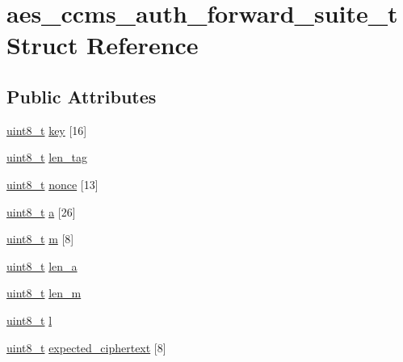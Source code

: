 \hypertarget{structaes__ccms__auth__forward__suite__t}{}\section{aes\+\_\+ccms\+\_\+auth\+\_\+forward\+\_\+suite\+\_\+t Struct Reference}
\label{structaes__ccms__auth__forward__suite__t}
\subsection*{Public Attributes}
\begin{DoxyCompactItemize}
\item 
\hyperlink{_p_e___types_8h_aba7bc1797add20fe3efdf37ced1182c5}{uint8\+\_\+t} \hyperlink{structaes__ccms__auth__forward__suite__t_a47a01dba8f3ab523da7969298e3bc4a3}{key} \mbox{[}16\mbox{]}
\item 
\hyperlink{_p_e___types_8h_aba7bc1797add20fe3efdf37ced1182c5}{uint8\+\_\+t} \hyperlink{structaes__ccms__auth__forward__suite__t_aa2c4b87795a4d73e649721442713d1e8}{len\+\_\+tag}
\item 
\hyperlink{_p_e___types_8h_aba7bc1797add20fe3efdf37ced1182c5}{uint8\+\_\+t} \hyperlink{structaes__ccms__auth__forward__suite__t_aad0f471a708074e5f342a2c31bdd879f}{nonce} \mbox{[}13\mbox{]}
\item 
\hyperlink{_p_e___types_8h_aba7bc1797add20fe3efdf37ced1182c5}{uint8\+\_\+t} \hyperlink{structaes__ccms__auth__forward__suite__t_afaf316fe3f8b08ed18339aabeed76586}{a} \mbox{[}26\mbox{]}
\item 
\hyperlink{_p_e___types_8h_aba7bc1797add20fe3efdf37ced1182c5}{uint8\+\_\+t} \hyperlink{structaes__ccms__auth__forward__suite__t_a3546394facafa867e6bf1993cc6cf8ba}{m} \mbox{[}8\mbox{]}
\item 
\hyperlink{_p_e___types_8h_aba7bc1797add20fe3efdf37ced1182c5}{uint8\+\_\+t} \hyperlink{structaes__ccms__auth__forward__suite__t_a5dbc25cf21067f91cbecfa9c104be243}{len\+\_\+a}
\item 
\hyperlink{_p_e___types_8h_aba7bc1797add20fe3efdf37ced1182c5}{uint8\+\_\+t} \hyperlink{structaes__ccms__auth__forward__suite__t_aad1b00075b02f5d48ba243f19eaa5d7c}{len\+\_\+m}
\item 
\hyperlink{_p_e___types_8h_aba7bc1797add20fe3efdf37ced1182c5}{uint8\+\_\+t} \hyperlink{structaes__ccms__auth__forward__suite__t_a1d50861c216b3b615c47a7b856e4d029}{l}
\item 
\hyperlink{_p_e___types_8h_aba7bc1797add20fe3efdf37ced1182c5}{uint8\+\_\+t} \hyperlink{structaes__ccms__auth__forward__suite__t_a2f8ee0f2a8cbb5d5d37cde22f2143976}{expected\+\_\+ciphertext} \mbox{[}8\mbox{]}
\end{DoxyCompactItemize}



